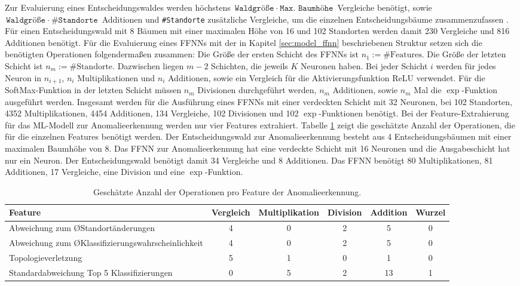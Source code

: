 \newline
\newline
Zur Evaluierung eines Entscheidungswaldes werden höchstens
\newline
$\texttt{Waldgröße}\ \cdot\ \texttt{Max. Baumhöhe}$ Vergleiche benötigt,
sowie $\texttt{Waldgröße}\ \cdot\ \texttt{\#Standorte}$ Additionen und \texttt{\#Standorte} zusätzliche Vergleiche, um die einzelnen Entscheidungsbäume zusammenzufassen \cite{dymelThesis}.
Für einen Entscheidungswald mit 8 Bäumen mit einer maximalen Höhe von 16 und 102 Standorten werden damit 230 Vergleiche und 816 Additionen benötigt.
\newpage
Für die Evaluierung eines FFNNs mit der in Kapitel \ref{sec:model_ffnn} beschriebenen Struktur setzen sich die benötigten Operationen folgendermaßen zusammen:
Die Größe der ersten Schicht des FFNNs ist $n_1:=\text{\#Features}$.
Die Größe der letzten Schicht ist $n_m:=\text{\#Standorte}$.
Dazwischen liegen $m-2$ Schichten, die jeweils $K$ Neuronen haben.
Bei jeder Schicht $i$ werden für jedes Neuron in $n_{i+1}$, $n_i$ Multiplikationen und $n_i$ Additionen, sowie ein Vergleich für die Aktivierungsfunktion ReLU verwendet.
Für die SoftMax-Funktion in der letzten Schicht müssen $n_m$ Divisionen durchgeführt werden, $n_m$ Additionen, sowie $n_m$ Mal die $\exp$-Funktion ausgeführt werden.
Insgesamt werden für die Ausführung eines FFNNs mit einer verdeckten Schicht mit 32 Neuronen,
bei 102 Standorten, 4352 Multiplikationen, 4454 Additionen, 134 Vergleiche, 102 Divisionen und 102 $\exp$-Funktionen benötigt.
\newline
\newline
Bei der Feature-Extrahierung für das ML-Modell zur Anomalieerkennung werden nur vier Features extrahiert.
Tabelle \ref{tab:anomaly_feature_operation_complexity} zeigt die geschätzte Anzahl der Operationen, die für die einzelnen Features benötigt werden.
Der Entscheidungswald zur Anomalieerkennung besteht aus 4 Entscheidungsbäumen mit einer maximalen Baumhöhe von 8.
Das FFNN zur Anomalieerkennung hat eine verdeckte Schicht mit 16 Neuronen und die Ausgabeschicht hat nur ein Neuron.
Der Entscheidungswald benötigt damit 34 Vergleiche und 8 Additionen.
Das FFNN benötigt 80 Multiplikationen, 81 Additionen, 17 Vergleiche, eine Division und eine $\exp$-Funktion.
\begin{table}[h!]
    \centering
    \begin{tabular}{ | p{4.5cm} | c | c | c | c | c | }
        \hline
        Feature & Vergleich & Multiplikation & Division & Addition & Wurzel \\\hline
        Abweichung zum ØStandortänderungen & 4 & 0 & 2 & 5 & 0 \\\hline
        Abweichung zum ØKlassifizierungswahrscheinlichkeit & 4 & 0 & 2 & 5 & 0 \\\hline
        Topologieverletzung & 5 & 1 & 0 & 1 & 0 \\\hline
        Standardabweichung Top 5 Klassifizierungen & 0 & 5 & 2 & 13 & 1 \\\hline
    \end{tabular}
    \caption{Geschätzte Anzahl der Operationen pro Feature der Anomalieerkennung.}
    \label{tab:anomaly_feature_operation_complexity}
\end{table}
